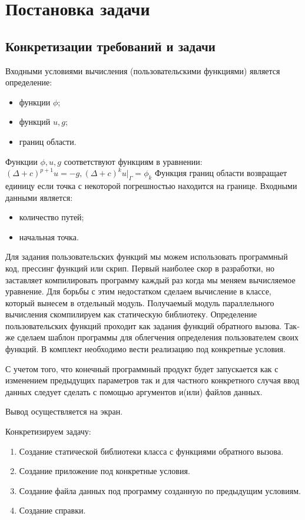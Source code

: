 \chapter{Постановка задачи}
\section{Конкретизации требований и задачи}
Входными условиями вычисления (пользовательскими функциями) является определение:
\begin{itemize}
	\item функции  $ \phi $;
	\item функций $ u,g $;
	\item границ области.
\end{itemize}
Функции $\phi,u,g $ соответствуют функциям в уравнении:
$ (\Delta +c)^{p+1}u=-g, (\Delta+c)^{k}u|_{\Gamma}=\phi_{k} $
Функция границ области возвращает единицу если точка с некоторой погрешностью находится на границе. 
Входными данными является:
\begin{itemize}
	\item количество путей;
	\item начальная точка.
\end{itemize}

Для задания пользовательских функций мы можем использовать программный код, прессинг функций или скрип. Первый наиболее скор в разработки, но заставляет компилировать программу каждый раз когда мы меняем вычисляемое уравнение. Для борьбы с этим недостатком сделаем вычисление в классе, который вынесем в отдельный модуль. Получаемый модуль параллельного вычисления скомпилируем как статическую библиотеку. Определение пользовательских функций проходит как задания функций обратного вызова. Так-же сделаем шаблон программы для облегчения определения пользователем своих функций. В комплект необходимо вести реализацию под конкретные условия. 

С учетом того, что конечный программный продукт будет запускается как с изменением предыдущих параметров так и для частного конкретного случая ввод данных следует сделать с помощью аргументов и(или) файлов данных.

Вывод осуществляется на экран. 

Конкретизируем задачу: 
\begin{enumerate}
	\item Создание статической библиотеки класса с функциями обратного вызова.
	\item Создание приложение под конкретные условия.
	\item Создание файла данных под программу созданную по предыдущим условиям.
	\item Создание справки.
\end{enumerate}

